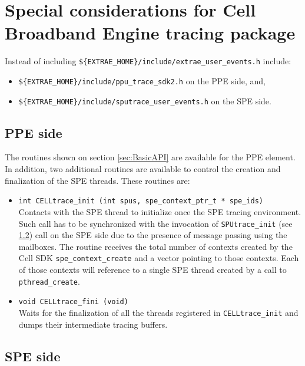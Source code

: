 \section{Special considerations for Cell Broadband Engine tracing package}

Instead of including {\tt \$\{EXTRAE\_HOME\}/include/extrae\_user\_events.h} include:
\begin{itemize}
 \item {\tt \$\{EXTRAE\_HOME\}/include/ppu\_trace\_sdk2.h} on the PPE side, and,
 \item {\tt \$\{EXTRAE\_HOME\}/include/sputrace\_user\_events.h} on the SPE side.
\end{itemize}

\subsection{PPE side}\label{subsec:PPEside}

The routines shown on section \ref{sec:BasicAPI} are available for the PPE element. In addition, two additional routines are available to control the creation and finalization of the SPE threads. These routines are:

\begin{itemize}

 \item {\tt int  CELLtrace\_init (int spus, spe\_context\_ptr\_t * spe\_ids)}\\
 Contacts with the SPE thread to initialize once the SPE tracing environment. Such call has to be synchronized with the invocation of {\tt SPUtrace\_init} (see \ref{subsec:SPEside}) call on the SPE side due to the presence of message passing using the mailboxes. The routine receives the total number of contexts created by the Cell SDK {\tt spe\_context\_create} and a vector pointing to those contexts. Each of those contexts will reference to a single SPE thread created by a call to {\tt pthread\_create}.

 \item {\tt void CELLtrace\_fini (void)}\\
 Waits for the finalization of all the threads registered in {\tt CELLtrace\_init} and dumps their intermediate tracing buffers.

\end{itemize}

\subsection{SPE side}\label{subsec:SPEside}

